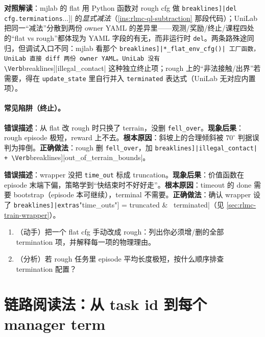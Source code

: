 \textbf{对照解读}：mjlab 的 flat 用 Python 函数对 rough cfg 做 \Verb[breaklines]|del cfg.terminations[...]| 的\emph{显式减法}（\cref{ins:rlmc-ql-subtraction} 那段代码）；UniLab 把同一“减法”分散到两份 owner YAML 的差异里——观测/奖励/终止/课程四处的“flat vs rough”都体现为 YAML 字段的有无，而非运行时 \verb|del|。两条路殊途同归，但调试入口不同：mjlab 看那个 \Verb[breaklines]|*_flat_env_cfg()| 工厂函数，UniLab 直接 diff 两份 owner YAML。UniLab 没有 \Verb[breaklines]|illegal_contact| 这种独立终止项；rough 上的“非法接触/出界”若需要，得在 \verb|update_state| 里自行并入 \verb|terminated| 表达式（UniLab 无对应内置项）。

\paragraph{常见陷阱（终止）。}

\begin{pitfall}
\textbf{错误描述}：从 flat 改 rough 时只换了 terrain，没删 \verb|fell_over|。\textbf{现象后果}：rough episode 极短，reward 上不去。\textbf{根本原因}：斜坡上的合理倾斜被 $70^\circ$ 判据误判为摔倒。\textbf{正确做法}：rough 删 \verb|fell_over|，加 \Verb[breaklines]|illegal_contact| + \Verb[breaklines]|out_of_terrain_bounds|。
\end{pitfall}

\begin{pitfall}
\textbf{错误描述}：wrapper 没把 \verb|time_out| 标成 truncation。\textbf{现象后果}：价值函数在 episode 末端下偏，策略学到“快结束时不好好走”。\textbf{根本原因}：timeout 的 done 需要 bootstrap（episode 本可继续），terminal 不需要。\textbf{正确做法}：确认 wrapper 设了 \Verb[breaklines]|extras["time_outs"] = truncated & ~terminated|（见 \cref{sec:rlmc-train-wrapper}）。
\end{pitfall}

\begin{practice}[终止设计]
\begin{enumerate}
\item （动手）把一个 flat cfg 手动改成 rough：列出你必须增/删的全部 termination 项，并解释每一项的物理理由。
\item （分析）若 rough 任务里 episode 平均长度极短，按什么顺序排查 termination 配置？
\end{enumerate}
\end{practice}

\section{链路阅读法：从 task id 到每个 manager term}
\label{sec:rlmc-ql-readpath}

